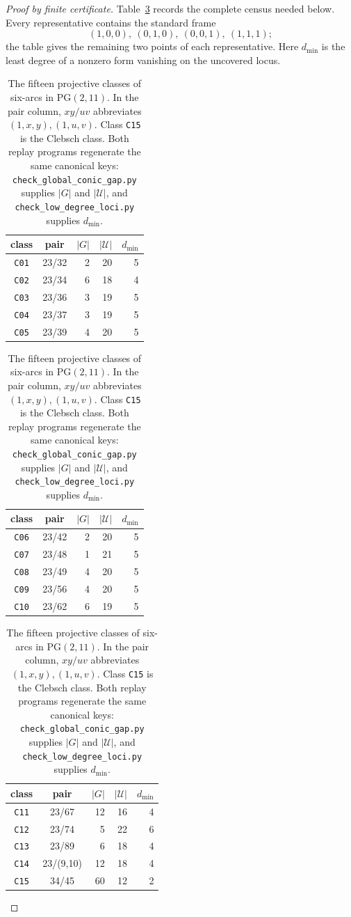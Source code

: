 \documentclass[11pt]{article}
\theoremstyle{remark}
\newcommand{\PG}{\mathrm{PG}}
\newcommand{\cU}{\mathcal{U}}
\begin{document}
\begin{proof}[Proof by finite certificate]
Table~\ref{tab:fifteen-classes} records the complete census needed below.
Every representative
contains the standard frame
\[
 (1,0,0),\ (0,1,0),\ (0,0,1),\ (1,1,1);
\]
the table gives the remaining two points of each representative.
Here $d_{\min}$ is the least degree of a nonzero form vanishing on the
uncovered locus.

\begin{table}[H]
\centering
\scriptsize
\begin{tabular}{@{}c c r r r@{}}
\toprule
class & pair & $|G|$ & $|\cU|$ & $d_{\min}$\\
\midrule
\texttt{C01}&23/32& 2&20&5\\
\texttt{C02}&23/34& 6&18&4\\
\texttt{C03}&23/36& 3&19&5\\
\texttt{C04}&23/37& 3&19&5\\
\texttt{C05}&23/39& 4&20&5\\
\bottomrule
\end{tabular}
\hfill
\begin{tabular}{@{}c c r r r@{}}
\toprule
class & pair & $|G|$ & $|\cU|$ & $d_{\min}$\\
\midrule
\texttt{C06}&23/42& 2&20&5\\
\texttt{C07}&23/48& 1&21&5\\
\texttt{C08}&23/49& 4&20&5\\
\texttt{C09}&23/56& 4&20&5\\
\texttt{C10}&23/62& 6&19&5\\
\bottomrule
\end{tabular}
\hfill
\begin{tabular}{@{}c c r r r@{}}
\toprule
class & pair & $|G|$ & $|\cU|$ & $d_{\min}$\\
\midrule
\texttt{C11}&23/67&12&16&4\\
\texttt{C12}&23/74& 5&22&6\\
\texttt{C13}&23/89& 6&18&4\\
\texttt{C14}&23/(9,10)&12&18&4\\
\texttt{C15}&34/45&60&12&2\\
\bottomrule
\end{tabular}
\caption{The fifteen projective classes of six-arcs in $\PG(2,11)$.
In the pair column, \(xy/uv\) abbreviates
\((1,x,y),(1,u,v)\).
Class \texttt{C15} is the Clebsch class.  Both replay programs regenerate
the same canonical keys: \texttt{check\_global\_conic\_gap.py} supplies
$|G|$ and $|\cU|$, and \texttt{check\_low\_degree\_loci.py} supplies
$d_{\min}$.}
\label{tab:fifteen-classes}
\end{table}


\end{proof}
\end{document}
